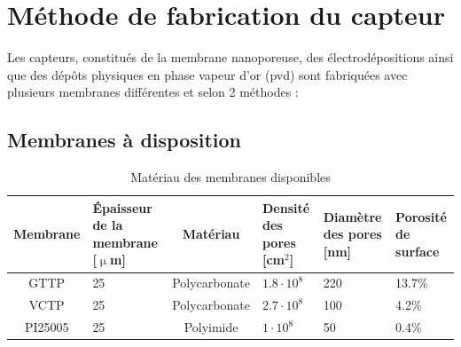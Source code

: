 \section{Méthode de fabrication du capteur}
\label{chap:capteur}
Les capteurs, constitués de la membrane nanoporeuse, des électrodépositions ainsi que des dépôts physiques en phase vapeur d'or (\gls{pvd}) sont 
fabriquées avec plusieurs membranes différentes et selon 2 méthodes :

\subsection{Membranes à disposition}
\begin{table}[H]
    \centering
    \begin{tabular}{|c|p{3cm}|c|p{3cm}|p{2cm}|p{2cm}|}
        \hline
        Membrane & Épaisseur de la membrane [$\upmu$m] & Matériau      & Densité des pores [cm$^2$] & Diamètre des pores [nm] & Porosité de surface \\
        \hline
        GTTP     & 25                                  & Polycarbonate & $1.8 \cdot 10^8$           & 220                     & 13.7\%              \\
        \hline
        VCTP     & 25                                  & Polycarbonate & $2.7 \cdot 10^8$           & 100                     & 4.2\%               \\
        \hline
        PI25005  & 25                                  & Polyimide     & $1 \cdot 10^8$             & 50                      & 0.4\%               \\
        \hline
    \end{tabular}
    \caption{Matériau des membranes disponibles}
    \label{tab:membranes}
\end{table}

\newpage
